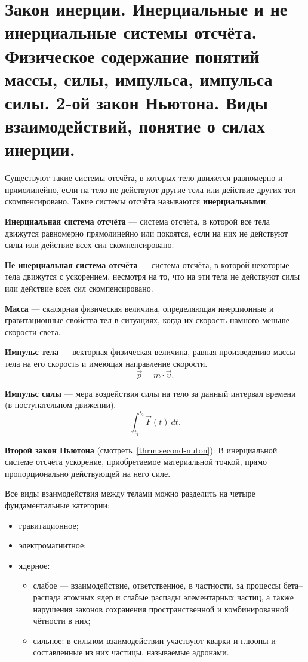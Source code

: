 \documentclass[10pt]{scrbook}
\begin{document}
\section[второй вопрос]{Закон инерции. Инерциальные и не инерциальные системы
  отсчёта. Физическое содержание понятий массы, силы, импульса, импульса силы.
  2-ой закон Ньютона. Виды взаимодействий, понятие о силах инерции.}

Существуют такие системы отсчёта, в которых тело движется равномерно и
прямолинейно, если на тело не действуют другие тела или действие других тел
скомпенсировано. Такие системы отсчёта называются \textbf{инерциальными}.

\textbf{Инерциальная система отсчёта} --- система отсчёта, в которой все тела
движутся равномерно прямолинейно или покоятся, если на них не действуют силы
или действие всех сил скомпенсировано.

\textbf{Не инерциальная система отсчёта} --- система отсчёта, в которой
некоторые тела движутся с ускорением, несмотря на то, что на эти тела не
действуют силы или действие всех сил скомпенсировано.

\textbf{Масса} — скалярная физическая величина, определяющая инерционные и
гравитационные свойства тел в ситуациях, когда их скорость намного меньше
скорости света.

\textbf{Импульс тела} — векторная физическая величина, равная произведению
массы тела на его скорость и имеющая направление скорости. \[
	\vec{p} = m \cdot \vec{\upsilon}
	.\]

\textbf{Импульс силы} --- мера воздействия силы на тело за данный интервал
времени (в поступательном движении). \[
	\int_{{t_1}}^{{t_2}} {\vec{F}(t)} \: d{t}
	.\]

\textbf{Второй закон Ньютона} (смотреть~\ref{thrm:second-nuton}): В
инерциальной системе отсчёта ускорение, приобретаемое материальной точкой,
прямо пропорционально действующей на него силе.

Все виды взаимодействия между телами можно разделить на четыре фундаментальные
категории:
\begin{itemize}
	\item гравитационное;
	\item электромагнитное;
	\item ядерное:
	      \begin{itemize}
		      \item слабое --- взаимодействие, ответственное, в частности, за
		            процессы бета--распада атомных ядер и слабые распады элементарных
		            частиц, а также нарушения законов сохранения пространственной и
		            комбинированной чётности в них;
		      \item сильное: в сильном взаимодействии участвуют кварки и глюоны и
		            составленные из них частицы, называемые адронами.
	      \end{itemize}
\end{itemize}
\end{document}
